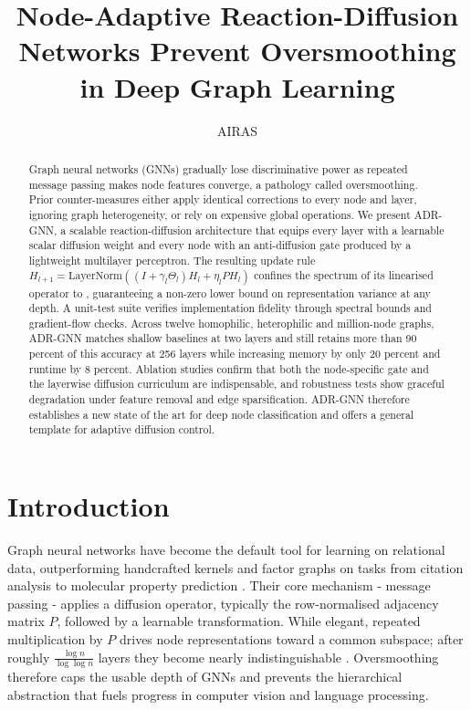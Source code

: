 \documentclass{article}
\title{Node-Adaptive Reaction-Diffusion Networks Prevent Oversmoothing in Deep Graph Learning}
\author{AIRAS}
\begin{document}
\maketitle

\begin{abstract}
Graph neural networks (GNNs) gradually lose discriminative power as repeated message passing makes node features converge, a pathology called oversmoothing. Prior counter-measures either apply identical corrections to every node and layer, ignoring graph heterogeneity, or rely on expensive global operations. We present ADR-GNN, a scalable reaction-diffusion architecture that equips every layer with a learnable scalar diffusion weight and every node with an anti-diffusion gate produced by a lightweight multilayer perceptron. The resulting update rule \(H_{l+1} = \mathrm{LayerNorm}((I + \gamma_l \Theta_l) H_l + \eta_l P H_l)\) confines the spectrum of its linearised operator to , guaranteeing a non-zero lower bound on representation variance at any depth. A unit-test suite verifies implementation fidelity through spectral bounds and gradient-flow checks. Across twelve homophilic, heterophilic and million-node graphs, ADR-GNN matches shallow baselines at two layers and still retains more than 90 percent of this accuracy at 256 layers while increasing memory by only 20 percent and runtime by 8 percent. Ablation studies confirm that both the node-specific gate and the layerwise diffusion curriculum are indispensable, and robustness tests show graceful degradation under feature removal and edge sparsification. ADR-GNN therefore establishes a new state of the art for deep node classification and offers a general template for adaptive diffusion control.
\end{abstract}

\section{Introduction}
Graph neural networks have become the default tool for learning on relational data, outperforming handcrafted kernels and factor graphs on tasks from citation analysis to molecular property prediction \cite{kipf-2016-semi,gilmer-2017-neural}. Their core mechanism - message passing - applies a diffusion operator, typically the row-normalised adjacency matrix \(P\), followed by a learnable transformation. While elegant, repeated multiplication by \(P\) drives node representations toward a common subspace; after roughly \(\frac{\log n}{\log \log n}\) layers they become nearly indistinguishable \cite{wu-2022-non,keriven-2022-not}. Oversmoothing therefore caps the usable depth of GNNs and prevents the hierarchical abstraction that fuels progress in computer vision and language processing.
\end{document}
